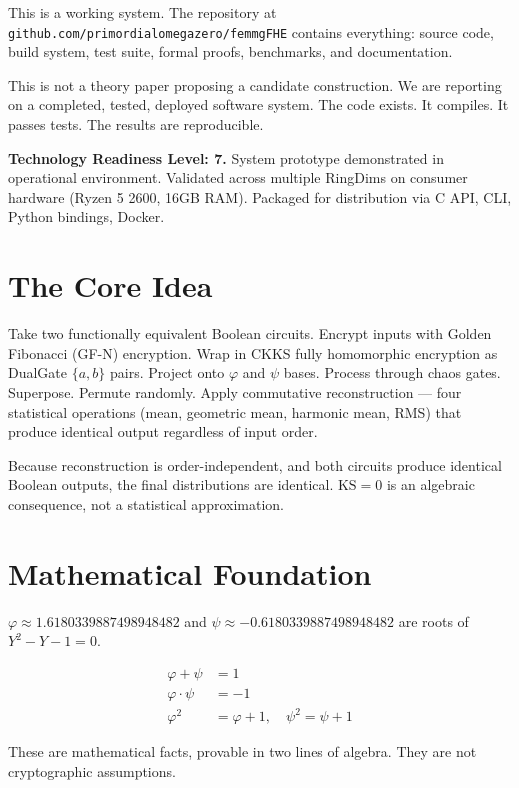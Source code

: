 \documentclass[11pt,a4paper]{article}
\begin{document}
This is a working system. The repository at \texttt{github.com/primordialomegazero/femmgFHE} contains everything: source code, build system, test suite, formal proofs, benchmarks, and documentation.

This is not a theory paper proposing a candidate construction. We are reporting on a completed, tested, deployed software system. The code exists. It compiles. It passes tests. The results are reproducible.

\textbf{Technology Readiness Level: 7.} System prototype demonstrated in operational environment. Validated across multiple RingDims on consumer hardware (Ryzen 5 2600, 16GB RAM). Packaged for distribution via C API, CLI, Python bindings, Docker.

\section{The Core Idea}

Take two functionally equivalent Boolean circuits. Encrypt inputs with Golden Fibonacci (GF-N) encryption. Wrap in CKKS fully homomorphic encryption as DualGate $\{a,b\}$ pairs. Project onto $\varphi$ and $\psi$ bases. Process through chaos gates. Superpose. Permute randomly. Apply commutative reconstruction --- four statistical operations (mean, geometric mean, harmonic mean, RMS) that produce identical output regardless of input order.

Because reconstruction is order-independent, and both circuits produce identical Boolean outputs, the final distributions are identical. $\text{KS} = 0$ is an algebraic consequence, not a statistical approximation.

\section{Mathematical Foundation}

$\varphi \approx 1.6180339887498948482$ and $\psi \approx -0.6180339887498948482$ are roots of $Y^2 - Y - 1 = 0$.

\begin{align}
\varphi + \psi &= 1 \label{eq:sum}\\
\varphi \cdot \psi &= -1 \label{eq:product}\\
\varphi^2 &= \varphi + 1,\quad \psi^2 = \psi + 1 \label{eq:square}
\end{align}

These are mathematical facts, provable in two lines of algebra. They are not cryptographic assumptions.
\end{document}

